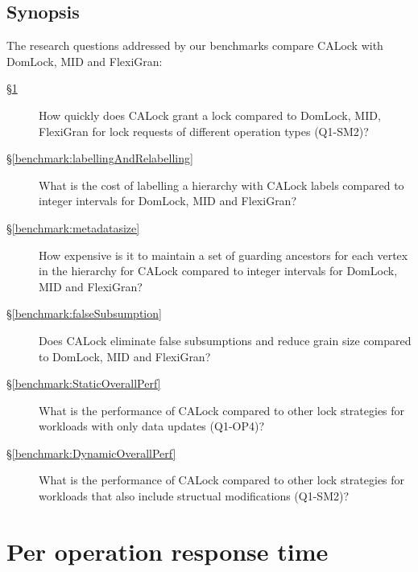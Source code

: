 	\subsection{Synopsis}

	The research questions addressed by our benchmarks compare CALock with DomLock, MID and FlexiGran:

	\begin{description}
		\item[\S \ref{benchmark:PerOpLatency}] How quickly does CALock grant a lock compared to DomLock, MID, FlexiGran for lock requests of different operation types (Q1-SM2)?
		
		\item[\S \ref{benchmark:labellingAndRelabelling}] What is the cost of labelling a hierarchy with CALock labels compared to integer intervals for DomLock, MID and FlexiGran?
		
		\item [\S \ref{benchmark:metadatasize}] How expensive is it to maintain a set of guarding ancestors for each vertex in the hierarchy for CALock compared to integer intervals for DomLock, MID and FlexiGran? 
	
		\item[\S \ref{benchmark:falseSubsumption}] Does CALock eliminate false subsumptions and reduce grain size compared to DomLock, MID and FlexiGran?
		\item[\S \ref{benchmark:StaticOverallPerf}] What is the performance of CALock compared to other lock strategies for workloads with only data updates (Q1-OP4)?
	
		\item[\S \ref{benchmark:DynamicOverallPerf}] What is the performance of CALock compared to other lock strategies for workloads that also include structual modifications (Q1-SM2)?
	\end{description}
	
	
\section{Per operation response time} \label{benchmark:PerOpLatency}

